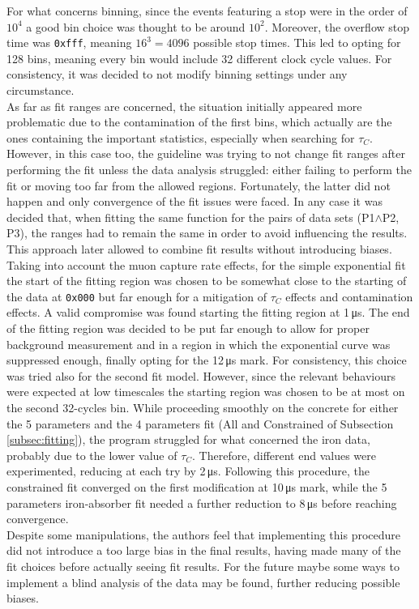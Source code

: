 \documentclass[../main.tex]{subfiles}
\begin{document}
For what concerns binning, since the events featuring a stop were in the order of $10^4$ a good bin choice was thought to be around $10^2$. Moreover, the overflow stop time was \texttt{0xfff}, meaning $16^3=4096$ possible stop times. This led to opting for 128 bins, meaning every bin would include 32 different clock cycle values. For consistency, it was decided to not modify binning settings under any circumstance.\\

As far as fit ranges are concerned, the situation initially appeared more problematic due to the contamination of the first bins, which actually are the ones containing the important statistics, especially when searching for $\tau_C$. However, in this case too, the guideline was trying to not change fit ranges after performing the fit unless the data analysis struggled: either failing to perform the fit or moving too far from the allowed regions. Fortunately, the latter did not happen and only convergence of the fit issues were faced. In any case it was decided that, when fitting the same function for the pairs of data sets (P1$\land$P2, P3), the ranges had to remain the same in order to avoid influencing the results. This approach later allowed to combine fit results without introducing biases.\\

Taking into account the muon capture rate effects, for the simple exponential fit the start of the fitting region was chosen to be somewhat close to the starting of the data at \texttt{0x000} but far enough for a mitigation of $\tau_C$ effects and contamination effects. A valid compromise was found starting the fitting region at 1\,\si{\micro \second}. The end of the fitting region was decided to be put far enough to allow for proper background measurement and in a region in which the exponential curve was suppressed enough, finally opting for the 12\,\si{\micro \second} mark. For consistency, this choice was tried also for the second fit model. However, since the relevant behaviours were expected at low timescales the starting region was chosen to be at most on the second 32-cycles bin. While proceeding smoothly on the concrete for either the 5 parameters and the 4 parameters fit (All and Constrained of Subsection \ref{subsec:fitting}), the program struggled for what concerned the iron data, probably due to the lower value of $\tau_C$. Therefore, different end values were experimented, reducing at each try by 2\,\si{\micro \second}. Following this procedure, the constrained fit converged on the first modification at 10\,\si{\micro \second} mark, while the 5 parameters iron-absorber fit needed a further reduction to 8\,\si{\micro \second} before reaching convergence.\\

Despite some manipulations, the authors feel that implementing this procedure did not introduce a too large bias in the final results, having made many of the fit choices before actually seeing fit results. For the future maybe some ways to implement a blind analysis of the data may be found, further reducing possible biases.
\end{document}
